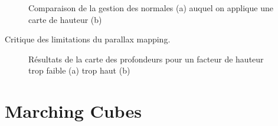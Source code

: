 \documentclass[a4paper]{article}
\begin{document}
\begin{figure}[H]
\centering
{}
\caption{Comparaison de la gestion des normales (a) auquel on applique une carte de hauteur (b)}
\end{figure}


Critique des limitations du parallax mapping.
\begin{figure}[H]
\centering
{}
\caption{Résultats de la carte des profondeurs pour un facteur de hauteur trop faible (a) trop haut (b)}
\end{figure}


\section{Marching Cubes}

\end{document}
